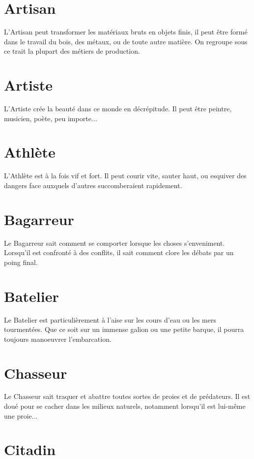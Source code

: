 \documentclass[a4paper,10pt,twoside,twocolumn,openany,bg=print]{dndbook}
\begin{document}
\section*{Artisan}

L'Artisan peut transformer les matériaux bruts en objets finis, il peut être formé dans le travail du bois, des métaux, ou de toute autre matière. On regroupe sous ce trait la plupart des métiers de production.

\section*{Artiste}

L'Artiste crée la beauté dans ce monde en décrépitude. Il peut être peintre, musicien, poète, peu importe...

\section*{Athlète}

L'Athlète est à la fois vif et fort. Il peut courir vite, sauter haut, ou esquiver des dangers face auxquels d'autres succomberaient rapidement.

\section*{Bagarreur}

Le Bagarreur sait comment se comporter lorsque les choses s'enveniment. Lorsqu'il est confronté à des conflits, il sait comment clore les débats par un poing final.

\section*{Batelier}

Le Batelier est particulièrement à l'aise sur les cours d'eau ou les mers tourmentées. Que ce soit sur un immense galion ou une petite barque, il pourra toujours manoeuvrer l'embarcation.

\section*{Chasseur}

Le Chasseur sait traquer et abattre toutes sortes de proies et de prédateurs. Il est doué pour se cacher dans les milieux naturels, notamment lorsqu'il est lui-même une proie...

\section*{Citadin}
\end{document}
